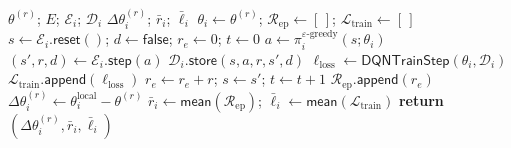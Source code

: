 \documentclass{article}
\begin{document}
\begin{algorithm}[H]
  \caption{\textsc{LocalTrain} at $\mathcal{DC}_i$}
  \label{alg:localtrain}
  \begin{algorithmic}[1]
  \REQUIRE $\theta^{(r)}$; $E$; $\mathcal{E}_i$; $\mathcal{D}_i$
  \ENSURE $\Delta\theta_i^{(r)}$; $\bar{r}_i$; $\bar{\ell}_i$
  \STATE $\theta_i \leftarrow \theta^{(r)}$; $\mathcal{R}_{\mathrm{ep}}\leftarrow[\,]$; $\mathcal{L}_{\mathrm{train}}\leftarrow[\,]$
    \STATE $s\leftarrow\mathcal{E}_i.\mathsf{reset}()$; $d\leftarrow\mathsf{false}$; $r_e\leftarrow0$; $t\leftarrow0$
      \STATE $a\leftarrow\pi_i^{\varepsilon\text{-greedy}}(s;\theta_i)$
      \STATE $(s',r,d)\leftarrow\mathcal{E}_i.\mathsf{step}(a)$
      \STATE $\mathcal{D}_i.\mathsf{store}(s,a,r,s',d)$
      \STATE $\ell_{\mathrm{loss}}\leftarrow\mathsf{DQNTrainStep}(\theta_i,\mathcal{D}_i)$
        \STATE $\mathcal{L}_{\mathrm{train}}.\mathsf{append}(\ell_{\mathrm{loss}})$
      \ENDIF
      \STATE $r_e\leftarrow r_e+r$; $s\leftarrow s'$; $t\leftarrow t+1$
    \ENDWHILE
    \STATE $\mathcal{R}_{\mathrm{ep}}.\mathsf{append}(r_e)$
  \ENDFOR
  \STATE $\Delta\theta_i^{(r)}\leftarrow\theta_i^{\mathrm{local}}-\theta^{(r)}$
  \STATE $\bar{r}_i\leftarrow\mathsf{mean}(\mathcal{R}_{\mathrm{ep}})$; $\bar{\ell}_i\leftarrow\mathsf{mean}(\mathcal{L}_{\mathrm{train}})$
  \STATE \textbf{return} $(\Delta\theta_i^{(r)},\bar{r}_i,\bar{\ell}_i)$
  \end{algorithmic}
\end{algorithm}
\end{document}
